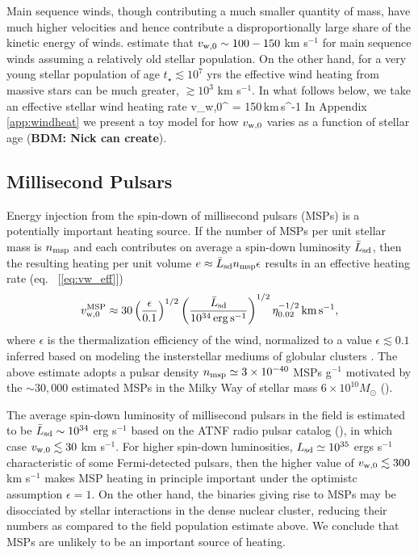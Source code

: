 \documentclass[usenatbib,fleqn]{mn2e}
\begin{document}
Main sequence winds, though contributing a much smaller quantity of
mass, have much higher velocities and hence contribute a
disproportionally large share of the kinetic energy of winds.
\citet{NaimanSoares-Furtado+:2013a} estimate that $v_{\rm w,0} \sim
100-150$ km s$^{-1}$ for main sequence winds assuming a relatively old
stellar population.  On the other hand, for a very young stellar
population of age $t_{\star} \lesssim 10^{7}$ yrs the effective wind
heating from massive stars can be much greater, $\gtrsim 10^{3}$ km
s$^{-1}$.  In what follows below, we take an effective stellar wind
heating rate \be v_{\rm w,0}^{\star} = 150\,{\rm km\,s^{-1}} \ee In
Appendix \ref{app:windheat} we present a toy model for how $v_{\rm
  w,0}$ varies as a function of stellar age ({\bf BDM: Nick can
  create}).

\subsection{Millisecond Pulsars} Energy injection from the spin-down of millisecond pulsars (MSPs) is a potentially important heating source.  If the number of MSPs per unit stellar mass is $n_{\rm msp}$ and each contributes on average a spin-down luminosity $\bar{L}_{\rm sd}$, then the resulting heating per unit volume $e \approx \bar{L}_{\rm sd}n_{\rm
  msp}\epsilon$ results in an effective heating rate (eq.~ [\ref{eq:vw_eff}])
\begin{eqnarray}
  v_{\rm w,0}^{\rm MSP} \approx 30\left(\frac{\epsilon}{0.1}\right)^{1/2}\left(\frac{\bar{L}_{\rm
        sd}}{10^{34}\,{\rm erg\,s^{-1}}}\right)^{1/2}
  \eta_{0.02}^{-1/2}\,{\rm km\,s^{-1}},
  \end{eqnarray}
where $\epsilon$ is the thermalization efficiency of the wind, normalized to a value $\epsilon \lesssim 0.1$ inferred based on modeling the insterstellar mediums of globular clusters \citep{NaimanSoares-Furtado+:2013a}.  The above estimate adopts a pulsar density $n_{\rm msp}\simeq3 \times 10^{-40} $ MSPs g$^{-1}$ motivated by the $\sim 30,000$ estimated MSPs in the Milky Way of stellar mass $6\times 10^{10}M_{\odot}$ (\citealt{Lorimer13}).  

The average spin-down luminosity of millisecond pulsars in the field is estimated to be $\bar{L}_{\rm sd} \sim 10^{34}$ erg s$^{-1}$ based on the ATNF radio pulsar catalog (\citealt{Manchester+05}), in which case $v_{\rm w,0} \lesssim 30$ km s$^{-1}$.  For higher spin-down luminosities, $L_{\rm sd}\simeq 10^{35}$ ergs s$^{-1}$ characteristic of some Fermi-detected pulsars, then the higher value of $v_{\rm w,0} \lesssim 300$ km s$^{-1}$ makes MSP heating in principle important under the optimistc assumption $\epsilon = 1$.  On the other hand, the binaries giving rise to MSPs may be disocciated by stellar interactions in the dense nuclear cluster, reducing their numbers as compared to the field population estimate above.  We conclude that MSPs are unlikely to be an important source of heating.  
\end{document}
